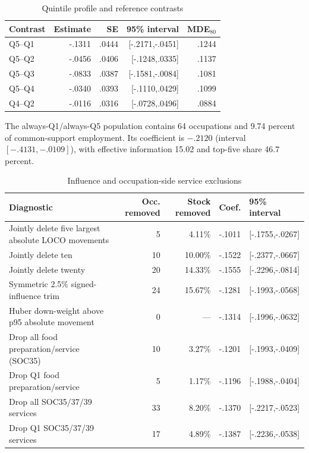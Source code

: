 \begin{table}[htbp]
\centering
\caption{Quintile profile and reference contrasts}\label{tab:appreference}
\small
\begin{tabular}{lrrrr}
\toprule
Contrast & Estimate & SE & 95\% interval & MDE$_{80}$ \\
\midrule
Q5--Q1 & -.1311 & .0444 & [-.2171,-.0451] & .1244 \\
Q5--Q2 & -.0456 & .0406 & [-.1248,.0335] & .1137 \\
Q5--Q3 & -.0833 & .0387 & [-.1581,-.0084] & .1081 \\
Q5--Q4 & -.0340 & .0393 & [-.1110,.0429] & .1099 \\
Q4--Q2 & -.0116 & .0316 & [-.0728,.0496] & .0884 \\
\bottomrule
\end{tabular}
\end{table}

The always-Q1/always-Q5 population contains 64 occupations and 9.74 percent of common-support employment. Its coefficient is $-.2120$ (interval $[-.4131,-.0109]$), with effective information 15.02 and top-five share 46.7 percent.

\begin{table}[htbp]
\centering
\caption{Influence and occupation-side service exclusions}\label{tab:appinfluence}
\scriptsize
\begin{tabularx}{\textwidth}{YrrrY}
\toprule
Diagnostic & Occ. removed & Stock removed & Coef. & 95\% interval \\
\midrule
Jointly delete five largest absolute LOCO movements & 5 & 4.11\% & -.1011 & [-.1755,-.0267] \\
Jointly delete ten & 10 & 10.00\% & -.1522 & [-.2377,-.0667] \\
Jointly delete twenty & 20 & 14.33\% & -.1555 & [-.2296,-.0814] \\
Symmetric 2.5\% signed-influence trim & 24 & 15.67\% & -.1281 & [-.1993,-.0568] \\
Huber down-weight above p95 absolute movement & 0 & --- & -.1314 & [-.1996,-.0632] \\
\midrule
Drop all food preparation/service (SOC35) & 10 & 3.27\% & -.1201 & [-.1993,-.0409] \\
Drop Q1 food preparation/service & 5 & 1.17\% & -.1196 & [-.1988,-.0404] \\
Drop all SOC35/37/39 services & 33 & 8.20\% & -.1370 & [-.2217,-.0523] \\
Drop Q1 SOC35/37/39 services & 17 & 4.89\% & -.1387 & [-.2236,-.0538] \\
\bottomrule
\end{tabularx}
\end{table}

